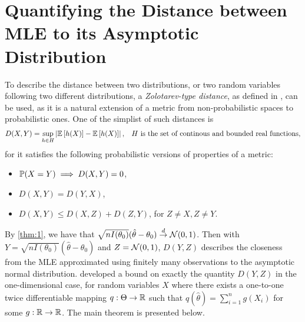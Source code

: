 

\section{Quantifying the Distance between MLE to its Asymptotic Distribution}
To describe the distance between two distributions, or two random variables following two different distributions, a \emph{Zolotarev-type distance}, as defined in \cite{zolotarev1976metric}, can be used, as it is a natural extension of a metric from non-probabilistic spaces to probabilistic ones. One of the simplist of such distances is
\begin{align}
D(X,Y) = \sup_{h\in H} \left| \mathbb{E}\left[h(X)\right] - \mathbb{E}\left[h(X)\right] \right|, && H \text{ is the set of continous and bounded real functions},
\end{align}
for it satisfies the following probabilistic versions of properties of a metric:
\begin{itemize}
\item $\mathbb{P}(X=Y) \implies D(X,Y) = 0$,
\item $D(X,Y) = D(Y,X)$,
\item $D(X,Y) \leq D(X,Z) + D(Z,Y)$, for $Z\neq X, Z\neq Y$.
\end{itemize}
By \cref{thm:1}, we have that $\sqrt{nI(\theta_0)}(\hat{\theta} - \theta_0) \overset{d}{\rightarrow} \mathcal{N}(0, 1)$. Then with $Y = \sqrt{nI(\theta_0)}(\hat{\theta} - \theta_0)$ and $Z=\mathcal{N}(0,1)$, $D(Y,Z)$ describes the closeness from the MLE approximated using finitely many observations to the asymptotic normal distribution. \cite{anastasiou2015bounds} developed a bound on exactly the quantity $D(Y,Z)$ in the one-dimensional case, for random variables $X$ where there exists a one-to-one twice differentiable mapping $q: \Theta \rightarrow \mathbb{R}$ such that $q(\hat{\theta})=\sum_{i=1}^n g(X_i)$ for some $g:\mathbb{R}\rightarrow\mathbb{R}$. The main theorem is presented below.
